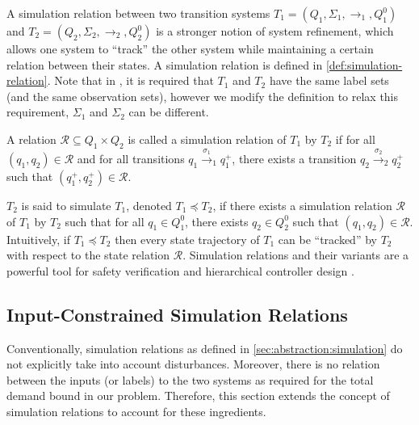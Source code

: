 A simulation relation between two transition systems $T_1 = (Q_1, \Sigma_1,
\rightarrow_1, Q^0_1)$ and $T_2 = (Q_2, \Sigma_2, \rightarrow_2, Q^0_2)$ is a
stronger notion of system refinement, which allows one system to ``track'' the
other system while maintaining a certain relation between their states. A
simulation relation is defined in \cref{def:simulation-relation}. Note that in
\cite{girardetal07amd}, it is required that $T_1$ and $T_2$ have the same
label sets (and the same observation sets), however we modify the definition
to relax this requirement, \ie $\Sigma_1$ and $\Sigma_2$ can be different.

\begin{definition}[Simulation]
  \label{def:simulation-relation}A relation $\mathcal{R} \subseteq Q_1 \times
  Q_2$ is called a simulation relation of $T_1$ by $T_2$ if for all $(q_1,
  q_2) \in \mathcal{R}$ and for all transitions $q_1 \xrightarrow{\sigma_1}_{1}
  q^+_1$, there exists a transition $q_2 \xrightarrow{\sigma_2}_{2}
  q^+_2$ such that $(q_1^+, q_2^+) \in \mathcal{R}$.
\end{definition}

$T_2$ is said to simulate $T_1$, denoted $T_1 \preceq T_2$, if there exists a
simulation relation $\mathcal{R}$ of $T_1$ by $T_2$ such that for all $q_1 \in
Q^0_1$, there exists $q_2 \in Q^0_2$ such that $(q_1, q_2) \in \mathcal{R}$.
Intuitively, if $T_1 \preceq T_2$ then every state trajectory of $T_1$ can be
``tracked'' by $T_2$ with respect to the state relation $\mathcal{R}$.
Simulation relations and their variants are a powerful tool for safety verification and
hierarchical controller design \cite{clarkeetal99m,pappasetal00hcc,GirardEtAl06vus,girardetal07amd}.

\subsection{Input-Constrained Simulation Relations}
\label{sec:abstraction:ext-simulation}

Conventionally, simulation relations as defined in \cref{sec:abstraction:simulation} do not explicitly take into account %
disturbances.  Moreover, there is no relation between the inputs (or labels) to the two systems as required for the total demand bound in our problem.  Therefore, this section extends the concept of simulation relations to account for these ingredients.

